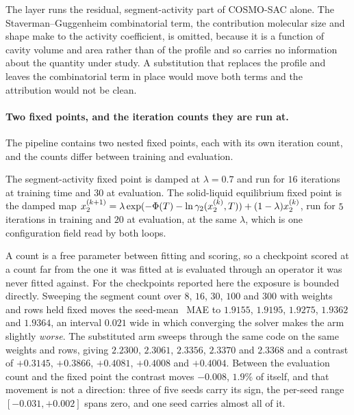 The layer runs the residual, segment-activity part of COSMO-SAC alone. The
Staverman--Guggenheim combinatorial term, the contribution molecular size and shape make to the
activity coefficient, is omitted, because it is a function of cavity volume and area rather than of
the profile and so carries no information about the quantity under study. A substitution that
replaces the profile and leaves the combinatorial term in place would move both terms and the
attribution would not be clean.

\paragraph{Two fixed points, and the iteration counts they are run at.}
The pipeline contains two nested fixed points, each with its own iteration count, and the counts
differ between training and evaluation.

The segment-activity fixed point is damped at $\lambda=0.7$ and run for $16$ iterations at training
time and $30$ at evaluation. The solid-liquid equilibrium fixed point is the damped map
$x_2^{(k+1)}=\lambda\exp(-\Phi(T)-\ln\gamma_2(x_2^{(k)},T))+(1-\lambda)x_2^{(k)}$, run for $5$
iterations in training and $20$ at evaluation, at the same $\lambda$, which is one configuration
field read by both loops.

A count is a free parameter between fitting and scoring, so a checkpoint scored at a count far from
the one it was fitted at is evaluated through an operator it was never fitted against. For the
checkpoints reported here the exposure is bounded directly. Sweeping the segment count over $8$,
$16$, $30$, $100$ and $300$ with weights and rows held fixed moves the seed-mean \lnx\ MAE to
$1.9155$, $1.9195$, $1.9275$, $1.9362$ and $1.9364$, an interval $0.021$ wide in which converging
the solver makes the arm slightly \emph{worse}. The substituted arm sweeps through the same code on
the same weights and rows, giving $2.2300$, $2.3061$, $2.3356$, $2.3370$ and $2.3368$ and a
contrast of $+0.3145$, $+0.3866$, $+0.4081$, $+0.4008$ and $+0.4004$. Between the evaluation count
and the fixed point the contrast moves $-0.008$, $1.9\%$ of itself, and that movement is not a
direction: three of five seeds carry its sign, the per-seed range $[-0.031,+0.002]$ spans zero, and
one seed carries almost all of it.

